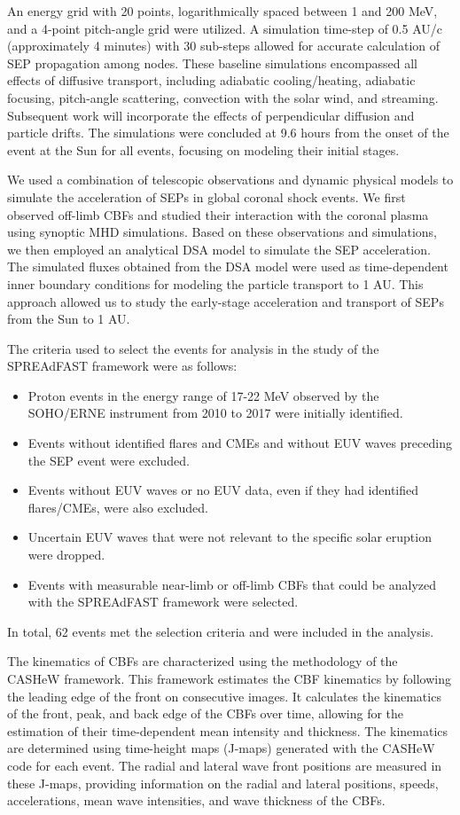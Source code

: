An energy grid with 20 points, logarithmically spaced between 1 and 200 MeV, and a 4-point pitch-angle grid were utilized. A simulation time-step of 0.5 AU/c (approximately 4 minutes) with 30 sub-steps allowed for accurate calculation of SEP propagation among nodes. These baseline simulations encompassed all effects of diffusive transport, including adiabatic cooling/heating, adiabatic focusing, pitch-angle scattering, convection with the solar wind, and streaming. Subsequent work will incorporate the effects of perpendicular diffusion and particle drifts. The simulations were concluded at 9.6 hours from the onset of the event at the Sun for all events, focusing on modeling their initial stages.

We used a combination of telescopic observations and dynamic physical models to simulate the acceleration of SEPs in global coronal shock events. We first observed off-limb CBFs and studied their interaction with the coronal plasma using synoptic MHD simulations. Based on these observations and simulations, we then employed an analytical DSA model to simulate the SEP acceleration. The simulated fluxes obtained from the DSA model were used as time-dependent inner boundary conditions for modeling the particle transport to 1 AU. This approach allowed us to study the early-stage acceleration and transport of SEPs from the Sun to 1 AU.

The criteria used to select the events for analysis in the study of the SPREAdFAST framework were as follows:
\begin{itemize}
    \item Proton events in the energy range of 17-22 MeV observed by the SOHO/ERNE instrument from 2010 to 2017 were initially identified.
    \item Events without identified flares and CMEs and without EUV waves preceding the SEP event were excluded.
    \item Events without EUV waves or no EUV data, even if they had identified flares/CMEs, were also excluded.
    \item Uncertain EUV waves that were not relevant to the specific solar eruption were dropped.
    \item Events with measurable near-limb or off-limb CBFs that could be analyzed with the SPREAdFAST framework were selected.
\end{itemize}
In total, 62 events met the selection criteria and were included in the analysis.

The kinematics of CBFs are characterized using the methodology of the CASHeW framework. This framework estimates the CBF kinematics by following the leading edge of the front on consecutive images. It calculates the kinematics of the front, peak, and back edge of the CBFs over time, allowing for the estimation of their time-dependent mean intensity and thickness. The kinematics are determined using time-height maps (J-maps) generated with the CASHeW code for each event. The radial and lateral wave front positions are measured in these J-maps, providing information on the radial and lateral positions, speeds, accelerations, mean wave intensities, and wave thickness of the CBFs.

